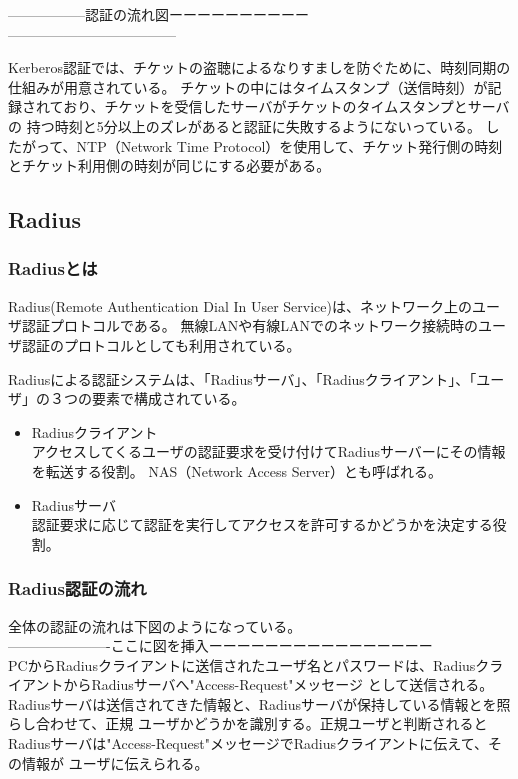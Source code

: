 \documentclass[12pt,a4paper,titlepage]{jsarticle}
\begin{document}
-----------------認証の流れ図ーーーーーーーーーー\\

------------------------------------
\par Kerberos認証では、チケットの盗聴によるなりすましを防ぐために、時刻同期の仕組みが用意されている。
チケットの中にはタイムスタンプ（送信時刻）が記録されており、チケットを受信したサーバがチケットのタイムスタンプとサーバの
持つ時刻と5分以上のズレがあると認証に失敗するようにないっている。
したがって、NTP（Network Time Protocol）を使用して、チケット発行側の時刻とチケット利用側の時刻が同じにする必要がある。


\subsection{Radius}

\subsubsection*{Radiusとは}
Radius(Remote Authentication Dial In User Service)は、ネットワーク上のユーザ認証プロトコルである。
無線LANや有線LANでのネットワーク接続時のユーザ認証のプロトコルとしても利用されている。


Radiusによる認証システムは、「Radiusサーバ」、「Radiusクライアント」、「ユーザ」の３つの要素で構成されている。

\begin{itemize}
    \item Radiusクライアント\mbox{}\\
    アクセスしてくるユーザの認証要求を受け付けてRadiusサーバーにその情報を転送する役割。
    NAS（Network Access Server）とも呼ばれる。
    \item Radiusサーバ\mbox{}\\
    認証要求に応じて認証を実行してアクセスを許可するかどうかを決定する役割。


\end{itemize}

\subsubsection*{Radius認証の流れ}
全体の認証の流れは下図のようになっている。\\
----------------------ここに図を挿入ーーーーーーーーーーーーーーーー\\

PCからRadiusクライアントに送信されたユーザ名とパスワードは、RadiusクライアントからRadiusサーバへ"Access-Request"メッセージ
として送信される。Radiusサーバは送信されてきた情報と、Radiusサーバが保持している情報とを照らし合わせて、正規
ユーザかどうかを識別する。正規ユーザと判断されるとRadiusサーバは"Access-Request"メッセージでRadiusクライアントに伝えて、その情報が
ユーザに伝えられる。
\end{document}
